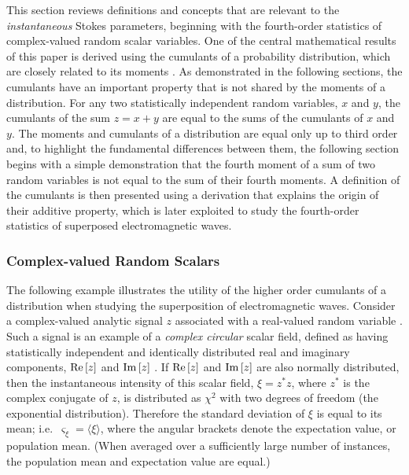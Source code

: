 \documentclass[twocolumn]{aastex6}
\newcommand{\real}{{\rm Re}}
\newcommand{\imag}{{\rm Im}}
\newcommand{\re}[1]{\real\ensuremath{ \left[ {#1} \right] }}
\newcommand{\im}[1]{\imag\ensuremath{ \left[ {#1} \right] }}
\newcommand{\mean}[1]{\ensuremath{ \langle #1 \rangle }}
\newcommand{\instI}{\ensuremath{\xi}}
\begin{document}
This section reviews definitions and concepts that are relevant to the
\emph{instantaneous} Stokes parameters, beginning with the
fourth-order statistics of complex-valued random scalar variables.
%
One of the central mathematical results of this paper is derived using
the cumulants of a probability distribution, which are closely related
to its moments \cite[e.g.][]{kso87}.  As
demonstrated in the following sections, the cumulants have an
important property that is not shared by the moments of a
distribution. For any two statistically independent random variables,
$x$ and $y$, the cumulants of the sum $z=x+y$ are equal to the sums of
the cumulants of $x$ and $y$.
%
The moments and cumulants of a distribution are equal only up to third
order and, to highlight the fundamental differences between them, the
following section begins with a simple demonstration that the fourth
moment of a sum of two random variables is not equal to the sum of
their fourth moments.
%
A definition of the cumulants is then presented using a derivation
that explains the origin of their additive property, which
%
is later exploited to study the fourth-order statistics of superposed
electromagnetic waves.





\subsubsection{Complex-valued Random Scalars}
\label{sec:complex_statistics}

The following example illustrates the utility of the higher order
cumulants of a distribution when studying the superposition of
electromagnetic waves.
%
%
Consider a complex-valued analytic signal $z$ associated with a
real-valued random variable \cite[e.g.][]{bra86b}.
%
Such a signal is an example of a {\it complex circular} scalar
field, defined as having statistically independent and 
identically distributed real and imaginary components, $\re{z}$ and
$\im{z}$ \citep[e.g.][]{pic94}.
%
If $\re{z}$ and $\im{z}$ are also normally distributed, then the
instantaneous intensity of this scalar field, $\instI=z^*z$, where $z^*$ is
the complex conjugate of $z$, is distributed as $\chi^2$ with two
degrees of freedom (the exponential distribution).
%
Therefore the standard deviation of $\instI$ is equal to its mean;
i.e.\ $\varsigma_\instI = \mean{\instI}$, where the angular brackets denote the
expectation value, or population mean.
%
(When averaged over a sufficiently large number of instances, the
population mean and expectation value are equal.)
\end{document}
